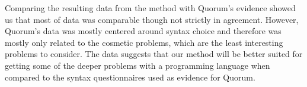 Comparing the resulting data from the method with Quorum’s evidence showed us that most of data was comparable though not strictly in agreement.
However, Quorum’s data was mostly centered around syntax choice and therefore was mostly only related to the cosmetic problems, which are the least interesting problems to consider.
The data suggests that our method will be better suited for getting some of the deeper problems with a programming language when compared to the syntax questionnaires used as evidence for Quorum.

